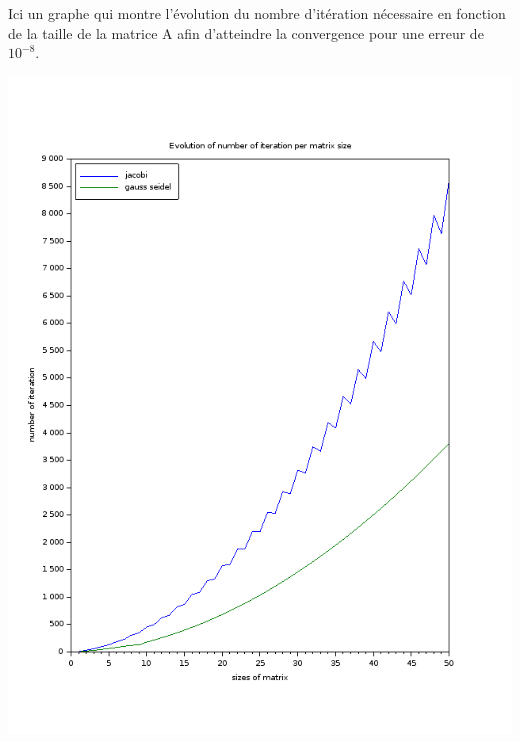 \documentclass[11pt]{article}
\begin{document}
Ici un graphe qui montre l'évolution du nombre d'itération nécessaire
en fonction de la taille de la matrice A afin d'atteindre la
convergence pour une erreur de $10^{-8}$.

\includegraphics[scale=0.5]{img/number_of_iteration.png}
\end{document}

